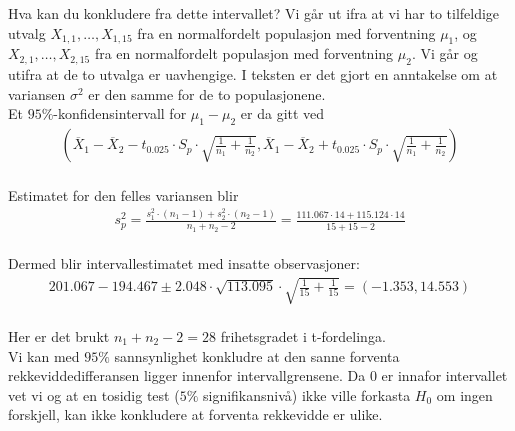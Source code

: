 \documentclass[final,hyperref={pdfpagelabels=false}]{beamer}
\newcommand{\maths}[1]{\vspace{-3mm}\begin{align*}#1\end{align*}\\\vspace{-3mm}}
\newcommand{\ol}[0]{\overline}
\begin{document}
\begin{frame}{}
\begin{columns}[t]
\begin{column}{.33\linewidth}
\begin{block}{}
{					Hva kan du konkludere fra dette intervallet?}
				{Vi går ut ifra at vi har to tilfeldige utvalg $X_{1,1},\ldots,X_{1,15}$ fra en normalfordelt populasjon med forventning $\mu_1$, og $X_{2,1},\ldots,X_{2,15}$ fra en normalfordelt populasjon med forventning $\mu_2$.
					Vi går og utifra at de to utvalga er uavhengige.
					I teksten er det gjort en anntakelse om at variansen $\sigma^2$ er den samme for de to populasjonene.\\
					Et $95\%$-konfidensintervall for $\mu_1-\mu_2$ er da gitt ved
					\maths{\left(\ol X_1 -\ol X_2-t_{0.025}\cdot S_p\cdot\sqrt{\frac{1}{n_1}+\frac{1}{n_2}},\ol X_1 -\ol X_2+t_{0.025}\cdot S_p\cdot\sqrt{\frac{1}{n_1}+\frac{1}{n_2}} \right)}
					Estimatet for den felles variansen blir
					\maths{s_p^2=\frac{s_1^2\cdot(n_1-1)+s_2^2\cdot(n_2-1)}{n_1+n_2-2}=\frac{111.067\cdot 14 + 115.124 \cdot 14}{15+15-2}}
					Dermed blir intervallestimatet med insatte observasjoner:
					\maths{201.067-194.467\pm2.048\cdot\sqrt{113.095}\cdot\sqrt{\frac{1}{15}+\frac{1}{15}}=(-1.353,14.553)}
					Her er det brukt $n_1+n_2-2=28$ frihetsgradet i t-fordelinga.\\
					Vi kan med $95\%$ sannsynlighet konkludre at den sanne forventa rekkeviddedifferansen ligger innenfor intervallgrensene.
					Da $0$ er innafor intervallet vet vi og at en tosidig test ($5\%$ signifikansnivå) ikke ville forkasta $H_0$ om ingen forskjell, kan ikke konkludere at forventa rekkevidde er ulike.
				}
			\end{block}
		\end{column}
	\end{columns}
\end{frame}
\end{document}
